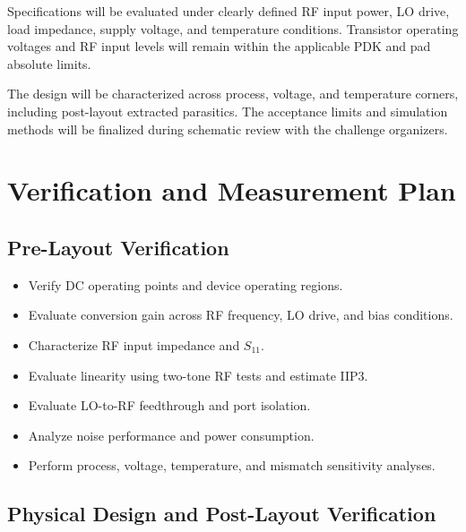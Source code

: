 \documentclass[11pt,letterpaper]{article}
\begin{document}
Specifications will be evaluated under clearly defined
RF input power, LO drive, load impedance, supply voltage,
and temperature conditions. Transistor operating voltages
and RF input levels will remain within the applicable
PDK and pad absolute limits.

The design will be characterized across process, voltage,
and temperature corners, including post-layout extracted
parasitics. The acceptance limits and simulation methods
will be finalized during schematic review with the
challenge organizers.


\section{Verification and Measurement Plan}

\subsection{Pre-Layout Verification}

\begin{itemize}
    \item Verify DC operating points and device
    operating regions.

    \item Evaluate conversion gain across RF frequency,
    LO drive, and bias conditions.

    \item Characterize RF input impedance and \(S_{11}\).

    \item Evaluate linearity using two-tone RF tests
    and estimate IIP3.

    \item Evaluate LO-to-RF feedthrough and port
    isolation.

    \item Analyze noise performance and power
    consumption.

    \item Perform process, voltage, temperature,
    and mismatch sensitivity analyses.
\end{itemize}


\subsection{Physical Design and Post-Layout Verification}
\end{document}
